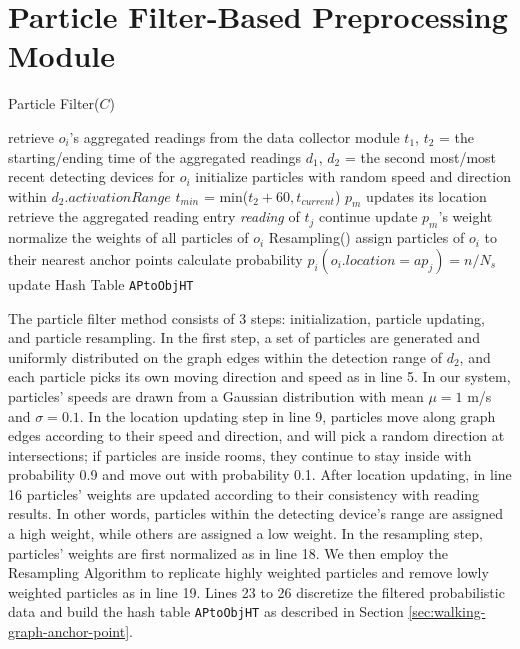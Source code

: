 \documentclass[12pt]{report}
\begin{document}
\section{Particle Filter-Based Preprocessing Module}
\label{sec:particle-filter-preprocessing}
\begin{algorithm}[!t]
  \caption{Particle Filter(\(C\))}
  \label{alg:particle-filter}
  \small
  \begin{algorithmic}[1]
    \STATE retrieve \(o_i\)'s aggregated readings from the data collector module
    \STATE \(t_1\), \(t_2\) = the starting/ending time of the aggregated readings
    \STATE \(d_1\), \(d_2\) = the second most/most recent detecting devices for \(o_i\)
    \STATE initialize particles with random speed and direction within \(d_2.activationRange\)
    \STATE \(t_{min}\) = min(\(t_2+60, t_{current}\))
    \STATE \(p_m\) updates its location
    \ENDFOR
    \STATE retrieve the aggregated reading entry \emph{reading} of \(t_j\)
    \STATE continue
    \ELSE
    \STATE update \(p_m\)'s weight
    \ENDFOR
    \STATE normalize the weights of all particles of \(o_i\)
    \STATE Resampling() %
    \ENDIF
    \ENDFOR
    \STATE assign particles of \(o_i\) to their nearest anchor points
    \STATE calculate probability \(p_i(o_i.location=ap_j)=n/N_s\)
    \STATE update Hash Table \texttt{APtoObjHT}
    \ENDFOR
    \ENDFOR
  \end{algorithmic}
\end{algorithm}

The particle filter method consists of 3 steps: initialization,
particle updating, and particle resampling.  In the first step, a
set of particles are generated and uniformly distributed on the
graph edges within the detection range of \(d_2\), and each
particle picks its own moving direction and speed as in line 5.
In our system, particles' speeds are drawn from a Gaussian
distribution with mean \(\mu=1\) m/s and \(\sigma=0.1\).  In the
location updating step in line 9, particles move along graph edges
according to their speed and direction, and will pick a random
direction at intersections; if particles are inside rooms, they
continue to stay inside with probability 0.9 and move out with
probability 0.1.  After location updating, in line 16 particles'
weights are updated according to their consistency with reading
results.  In other words, particles within the detecting device's
range are assigned a high weight, while others are assigned a low
weight.  In the resampling step, particles' weights are first
normalized as in line 18.  We then employ the Resampling Algorithm
\cite{yu2013-rfid} to replicate highly weighted particles and remove
lowly weighted particles as in line 19.  Lines 23 to 26 discretize
the filtered probabilistic data and build the hash table
\texttt{APtoObjHT} as described in Section
\ref{sec:walking-graph-anchor-point}.
\end{document}
